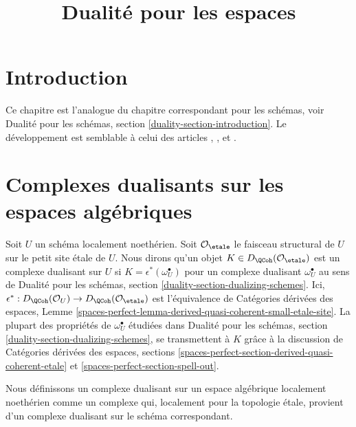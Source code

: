 

%


\title{Dualité pour les espaces}


\maketitle

\label{section-phantom}

\tableofcontents

\section{Introduction}
\label{section-introduction}

\noindent
Ce chapitre est l'analogue du chapitre correspondant pour les
schémas, voir Dualité pour les schémas, section \ref{duality-section-introduction}.
Le développement est semblable à celui des articles
\cite{Neeman-Grothendieck}, \cite{LN},
\cite{Lipman-notes} et \cite{Neeman-improvement}.




\section{Complexes dualisants sur les espaces algébriques}
\label{section-dualizing-spaces}

\noindent
Soit $U$ un schéma localement noethérien. Soit $\mathcal{O}_\etale$
le faisceau structural de $U$ sur le petit site \'etale de $U$.
Nous dirons qu'un objet $K \in D_\QCoh(\mathcal{O}_\etale)$ est
un complexe dualisant sur $U$ si $K = \epsilon^*(\omega_U^\bullet)$
pour un complexe dualisant $\omega_U^\bullet$ au sens de
Dualité pour les schémas, section \ref{duality-section-dualizing-schemes}.
Ici, $\epsilon^* : D_\QCoh(\mathcal{O}_U) \to D_\QCoh(\mathcal{O}_\etale)$
est l'équivalence de Catégories dérivées des espaces, Lemme
\ref{spaces-perfect-lemma-derived-quasi-coherent-small-etale-site}.
La plupart des propriétés de $\omega_U^\bullet$ étudiées dans
Dualité pour les schémas, section \ref{duality-section-dualizing-schemes},
se transmettent à $K$ grâce à la discussion de
Catégories dérivées des espaces, sections
\ref{spaces-perfect-section-derived-quasi-coherent-etale} et
\ref{spaces-perfect-section-spell-out}.

\medskip\noindent
Nous définissons un complexe dualisant sur un espace algébrique localement noethérien
comme un complexe qui, localement pour la topologie \'etale, provient d'un complexe dualisant
sur le schéma correspondant.

